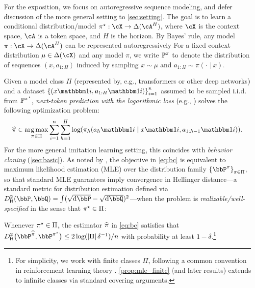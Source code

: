 For the exposition, we focus on autoregressive sequence modeling, and defer discussion of the more general \IL{} setting to \cref{sec:setting}. %
The goal is to learn a
conditional distribution/model $\pistar: \cX \to \Delta(\cA^H)$, where $\cX$
is the context space, $\cA$ is a token space, and $H$ is the horizon. By Bayes' rule, any model $\pi:\cX\to\Delta(\cA^H)$ can be represented autoregressively %
For a fixed context distribution $\mu \in \Delta(\cX)$ and any model
$\pi$, we write $\mathbb{P}^\pi$ to denote the distribution of sequences $(x,
a_{1:H})$ induced by sampling $x \sim \mu$ and $a_{1:H} \sim
\pi(\cdot\mid{}x)$. 

Given a model class $\Pi$ (represented by, e.g., transformers or
other deep networks) and a dataset
$\crl*{(x\ind{i},a_{1:H}\ind{i})}_{i=1}^n$ assumed to be sampled i.i.d. from $\mathbb{P}^{\pi^{\star}}$, \emph{next-token prediction with the logarithmic loss}
(e.g., \citet{radford2019language}) solves the following optimization problem: 
\begin{align}
  \label{eq:bc}
  \pihat \in \argmax_{\pi\in\Pi}
  \sum_{i=1}^{n}\sum_{h=1}^{H}\log\prn*{\pi_h(a_h\ind{i}\mid{}x\ind{i},a_{1:h-1}\ind{i})}.
\end{align}
For the more general imitation learning setting, this
  coincides with \emph{behavior cloning} (\cref{sec:basic}).
As noted by
\citet{foster2024behavior}, the objective in \cref{eq:bc} is equivalent
to maximum likelihood estimation (MLE) over the distribution family
$\crl*{\bbP^{\pi}}_{\pi\in\Pi}$, so that standard MLE guarantees
 imply convergence in
Hellinger distance---a standard metric for distribution estimation
defined via $\Dhels{\bbP}{\bbQ}=\int(\sqrt{\mathrm{d}\bbP}-\sqrt{\mathrm{d}\bbQ})^2$---when the problem is \emph{realizable/well-specified} in the sense
that $\pi^{\star}\in\Pi$:
\begin{proposition}
      \label{prop:mle_finite}
      Whenever $\pi^{\star}\in\Pi$, the estimator $\widehat{\pi}$ in \cref{eq:bc} satisfies that $\DhelsX{\big}{\bbP^{\pihat}}{\bbP^{\pistar}} \leq
  2\log(\abs{\Pi}\delta^{-1})/n$ with
      probability at least $1-\delta$.\footnote{For simplicity, we work with finite classes
        $\Pi$, following a
        common convention in reinforcement learning theory
        \citep{agarwal2019reinforcement}.  \cref{prop:mle_finite} (and later results) extends to infinite classes via standard covering arguments.
      }\loose
\end{proposition}


